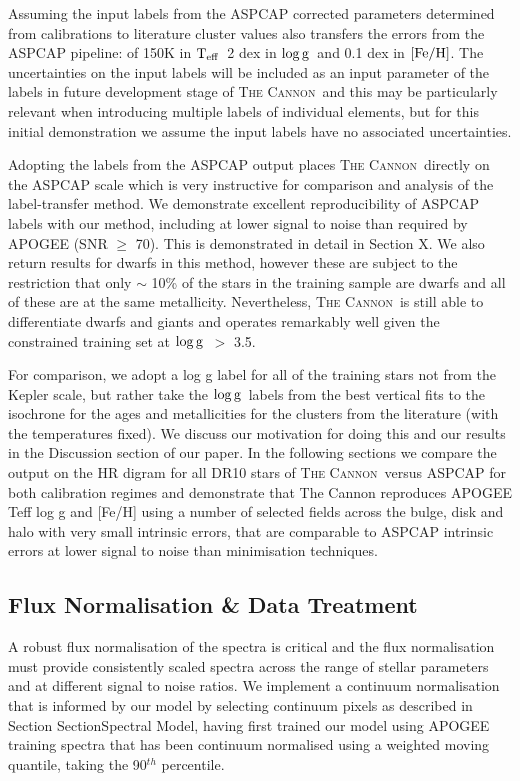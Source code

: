 \documentclass[12pt, preprint]{aastex}
\newcommand{\sectionname}{Section}
\newcommand{\teff}{\mbox{$\rm T_{eff}$}}
\newcommand{\feh}{\mbox{$\rm [Fe/H]$}}
\newcommand{\logg}{\mbox{$\rm \log g$}}
\newcommand{\tc}{\textsc{The Cannon}}
\begin{document}
Assuming the input labels from the ASPCAP corrected parameters determined from calibrations to literature cluster values also transfers the errors from the ASPCAP pipeline: of 150K in \teff\,  2 dex in \logg\ and 0.1 dex in \feh.   The uncertainties on the input labels will be included as an input parameter of the labels in future development stage of \tc\ and this may be particularly relevant when introducing multiple labels of individual elements, but for this initial demonstration we assume the input labels have no associated uncertainties. 

Adopting the labels from the ASPCAP output places \tc\ directly on the ASPCAP scale which is very instructive for comparison and analysis of the label-transfer method. We demonstrate excellent reproducibility of ASPCAP labels with our method, including at lower signal to noise than required by APOGEE (SNR $\ge$ 70). This is demonstrated in detail in Section X. We also return results for dwarfs in this method, however these are subject to the restriction that only $\sim$ 10\% of the stars in the training sample are dwarfs and all of these are at the same metallicity. Nevertheless, \tc\ is still able to differentiate dwarfs and giants and operates remarkably well given the constrained training set at \logg\ $>$ 3.5. 

For comparison, we adopt a log g label for all of the training stars not from the Kepler scale, but rather take the \logg\ labels from the best vertical fits to the isochrone for the ages and metallicities for the clusters from the literature (with the temperatures fixed). We discuss our motivation for doing this and our results in the Discussion section of our paper. In the following sections we compare the output on the HR digram for all DR10 stars of \tc\ versus ASPCAP for both calibration regimes and demonstrate that The Cannon reproduces APOGEE Teff log g and [Fe/H] using a number of selected fields across the bulge, disk and halo with very small intrinsic errors, that are comparable to ASPCAP intrinsic errors at lower signal to noise than minimisation techniques.

\subsection{Flux Normalisation \& Data Treatment}

A robust flux normalisation of the spectra is critical and the flux normalisation must provide consistently scaled spectra across the range of stellar parameters and at different signal to noise ratios. We implement a continuum normalisation that is informed by our model by selecting continuum pixels as described in Section \sectionname{Spectral Model}, having first trained our model using APOGEE training spectra that has been continuum normalised using a weighted moving quantile, taking the 90$^{th}$ percentile. 
\end{document}

